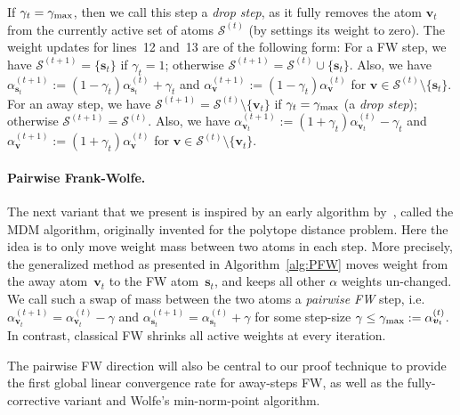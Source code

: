 \documentclass{article} %
\newcommand{\stepsize}{\gamma}
\newcommand{\stepmax}{\stepsize_{\textnormal{\scriptsize max}}} %
\newcommand{\s}{\bm{s}}
\newcommand{\vv}{\bm{v}} %
\newcommand{\Coreset}{\mathcal{S}}
\newcommand{\0}{\mathbf{0}} %
\begin{document}
If $\stepsize_t = \stepmax$, then we call this step a \emph{drop step}, as it
fully removes the atom $\vv_t$ from the currently active set of atoms
$\Coreset^{(t)}$ (by settings its weight to zero).
%
The weight updates for lines~12 and~13 are of the following form:
For a FW step, we have $\Coreset^{(t+1)} = \{\s_t\}$ if $\stepsize_t = 1$;
otherwise $\Coreset^{(t+1)} = \Coreset^{(t)} \cup \{\s_t\}$. Also, we have
$\alpha^{(t+1)}_{\s_t} := (1-\stepsize_t) \alpha^{(t)}_{\s_t} + \stepsize_t$
and $\alpha^{(t+1)}_{\vv} := (1-\stepsize_t) \alpha^{(t)}_{\vv}$ for $\vv \in
\Coreset^{(t)} \setminus  \{\s_t\}$. 
For an away step, we have $\Coreset^{(t+1)} = \Coreset^{(t)} \setminus
\{\vv_t\}$ if  $\stepsize_t = \stepmax$ (a \emph{drop step}); 
otherwise $\Coreset^{(t+1)} = \Coreset^{(t)}$.  Also, we have
$\alpha^{(t+1)}_{\vv_t} := (1+\stepsize_t) \alpha^{(t)}_{\vv_t} -
\stepsize_t$ and $\alpha^{(t+1)}_{\vv} := (1+\stepsize_t) \alpha^{(t)}_{\vv}$
for $\vv \in \Coreset^{(t)} \setminus  \{\vv_t\}$. \vspace{-2mm}

\paragraph{Pairwise Frank-Wolfe.}
The next variant that we present is inspired by an early algorithm
by~\citet{Mitchell:1974uy}, called the MDM %
algorithm, originally invented for the polytope distance problem. Here the
idea is to only move weight mass between two atoms in each step. More
precisely, the generalized method as presented in Algorithm~\ref{alg:PFW}
moves weight from the away atom~$\vv_t$ to the FW atom~$\s_t$, and keeps all
other $\alpha$ weights un-changed. 
We call such a swap of mass between the two atoms a \emph{pairwise FW} step,
i.e. $\alpha_{\vv_t}^{(t+1)} = \alpha_{\vv_t}^{(t)} - \stepsize$ and
$\alpha_{\s_t}^{(t+1)} = \alpha_{\s_t}^{(t)} + \stepsize$ for some step-size
$\stepsize \leq \stepmax := \alpha_{\vv_t}^{(t)}$. 
In contrast, classical FW shrinks all active weights at every iteration.

The pairwise FW direction will also be central to our proof technique to
provide the first global linear convergence rate for away-steps FW, as well
as the fully-corrective variant and Wolfe's min-norm-point algorithm. 
\end{document}
